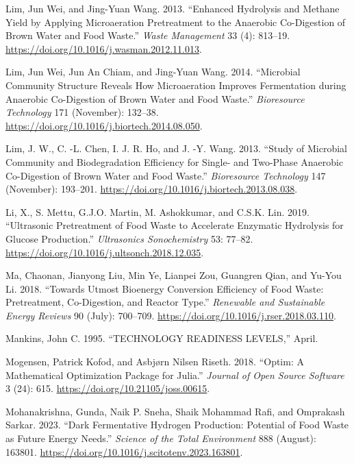 \documentclass[11pt]{report}
\begin{document}
\begin{hangparas}{1.5em}{1}
\hypertarget{citeproc_bib_item_41}{Lim, Jun Wei, and Jing-Yuan Wang. 2013. “Enhanced Hydrolysis and Methane Yield by Applying Microaeration Pretreatment to the Anaerobic Co-Digestion of Brown Water and Food Waste.” \textit{Waste Management} 33 (4): 813–19. \url{https://doi.org/10.1016/j.wasman.2012.11.013}.}

\hypertarget{citeproc_bib_item_42}{Lim, Jun Wei, Jun An Chiam, and Jing-Yuan Wang. 2014. “Microbial Community Structure Reveals How Microaeration Improves Fermentation during Anaerobic Co-Digestion of Brown Water and Food Waste.” \textit{Bioresource Technology} 171 (November): 132–38. \url{https://doi.org/10.1016/j.biortech.2014.08.050}.}

\hypertarget{citeproc_bib_item_43}{Lim, J. W., C. -L. Chen, I. J. R. Ho, and J. -Y. Wang. 2013. “Study of Microbial Community and Biodegradation Efficiency for Single- and Two-Phase Anaerobic Co-Digestion of Brown Water and Food Waste.” \textit{Bioresource Technology} 147 (November): 193–201. \url{https://doi.org/10.1016/j.biortech.2013.08.038}.}

\hypertarget{citeproc_bib_item_44}{Li, X., S. Mettu, G.J.O. Martin, M. Ashokkumar, and C.S.K. Lin. 2019. “Ultrasonic Pretreatment of Food Waste to Accelerate Enzymatic Hydrolysis for Glucose Production.” \textit{Ultrasonics Sonochemistry} 53: 77–82. \url{https://doi.org/10.1016/j.ultsonch.2018.12.035}.}

\hypertarget{citeproc_bib_item_45}{Ma, Chaonan, Jianyong Liu, Min Ye, Lianpei Zou, Guangren Qian, and Yu-You Li. 2018. “Towards Utmost Bioenergy Conversion Efficiency of Food Waste: Pretreatment, Co-Digestion, and Reactor Type.” \textit{Renewable and Sustainable Energy Reviews} 90 (July): 700–709. \url{https://doi.org/10.1016/j.rser.2018.03.110}.}

\hypertarget{citeproc_bib_item_46}{Mankins, John C. 1995. “TECHNOLOGY READINESS LEVELS,” April.}

\hypertarget{citeproc_bib_item_47}{Mogensen, Patrick Kofod, and Asbjørn Nilsen Riseth. 2018. “Optim: A Mathematical Optimization Package for Julia.” \textit{Journal of Open Source Software} 3 (24): 615. \url{https://doi.org/10.21105/joss.00615}.}

\hypertarget{citeproc_bib_item_48}{Mohanakrishna, Gunda, Naik P. Sneha, Shaik Mohammad Rafi, and Omprakash Sarkar. 2023. “Dark Fermentative Hydrogen Production: Potential of Food Waste as Future Energy Needs.” \textit{Science of the Total Environment} 888 (August): 163801. \url{https://doi.org/10.1016/j.scitotenv.2023.163801}.}


\end{hangparas}
\end{document}
